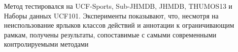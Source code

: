 Метод тестировался на
UCF-Sports, Sub-JHMDB, JHMDB, THUMOS13 и
Наборы данных UCF101. Эксперименты показывают, что, несмотря на
неиспользование ярлыков классов действий и аннотации к ограничивающим рамкам, получены результаты, сопоставимые с самыми
современными контролируемыми методами









